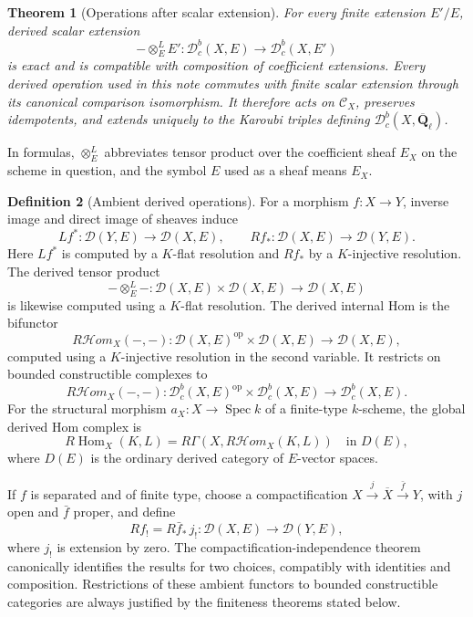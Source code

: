 \documentclass[10pt]{article}
\newtheorem{theorem}{Theorem}[section]
\theoremstyle{definition}
\newtheorem{definition}[theorem]{Definition}
\newcommand{\Qlb}{\overline{\mathbf Q}_\ell}
\newcommand{\Db}{\mathcal D}
\newcommand{\Dbc}{\mathcal D^b_c}
\newcommand{\Spec}{\operatorname{Spec}}
\begin{document}
\begin{theorem}[Operations after scalar extension]
For every finite extension \(E'/E\), derived scalar extension
\[
 -\otimes_E^LE':\Dbc(X,E)\longrightarrow\Dbc(X,E')
\]
is exact and is compatible with composition of coefficient extensions.
Every derived operation used in this note commutes with finite scalar
extension through its canonical comparison isomorphism.  It therefore acts
on \(\mathcal C_X\), preserves idempotents, and extends uniquely to the
Karoubi triples defining \(\Dbc(X,\Qlb)\).
\end{theorem}

In formulas, \(\otimes_E^L\) abbreviates tensor product over the coefficient
sheaf \(E_X\) on the scheme in question, and the symbol \(E\) used as a sheaf means
\(E_X\).

\begin{definition}[Ambient derived operations]
\label{def:ambient-operations}
For a morphism \(f:X\to Y\), inverse image and direct image of sheaves induce
\[
 Lf^*:\Db(Y,E)\longrightarrow\Db(X,E),
 \qquad
 Rf_*:\Db(X,E)\longrightarrow\Db(Y,E).
\]
Here \(Lf^*\) is computed by a \(K\)-flat resolution and \(Rf_*\) by a
\(K\)-injective resolution.  The derived tensor product
\[
 -\otimes_E^L-:\Db(X,E)\times\Db(X,E)\longrightarrow\Db(X,E)
\]
is likewise computed using a \(K\)-flat resolution.
The derived internal Hom is the bifunctor
\[
 R\mathcal Hom_X(-,-):
 \Db(X,E)^{\mathrm{op}}\times\Db(X,E)\longrightarrow\Db(X,E),
\]
computed using a \(K\)-injective resolution in the second variable.  It
restricts on bounded constructible complexes to
\[
 R\mathcal Hom_X(-,-):
 \Dbc(X,E)^{\mathrm{op}}\times\Dbc(X,E)\longrightarrow\Dbc(X,E).
\]
For the structural morphism \(a_X:X\to\Spec k\) of a finite-type
\(k\)-scheme, the global derived Hom complex is
\[
 R\operatorname{Hom}_X(K,L)
 =R\Gamma\!\left(X,R\mathcal Hom_X(K,L)\right)
 \quad\text{in }D(E),
\]
where \(D(E)\) is the ordinary derived category of \(E\)-vector spaces.

If \(f\) is separated and of finite type, choose a compactification
\(X\xrightarrow{j}\overline X\xrightarrow{\bar f}Y\), with \(j\) open and
\(\bar f\) proper, and define
\[
 Rf_!=R\bar f_*\,j_!:\Db(X,E)\longrightarrow\Db(Y,E),
\]
where \(j_!\) is extension by zero.  The compactification-independence
theorem canonically identifies the results for two choices, compatibly with
identities and composition.  Restrictions of these ambient functors to
bounded constructible categories are always justified by the finiteness
theorems stated below.
\end{definition}
\end{document}
